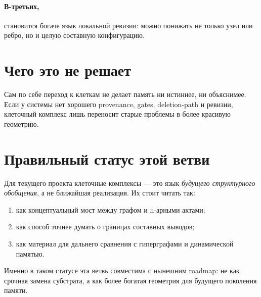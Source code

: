 \paragraph{В-третьих,} становится богаче язык локальной ревизии: можно понижать не
только узел или ребро, но и целую составную конфигурацию.

\section{Чего это не решает}

\begin{pitfall}
Сам по себе переход к клеткам не делает память ни истиннее, ни объяснимее. Если у
системы нет хорошего provenance, gates, deletion-path и ревизии, клеточный комплекс
лишь переносит старые проблемы в более красивую геометрию.
\end{pitfall}

\section{Правильный статус этой ветви}

Для текущего проекта клеточные комплексы — это язык \emph{будущего структурного
обобщения}, а не ближайшая реализация. Их стоит читать так:
\begin{enumerate}
\item как концептуальный мост между графом и n-арными актами;
\item как способ точнее думать о границах составных выводов;
\item как материал для дальнего сравнения с гиперграфами и динамической памятью.
\end{enumerate}

Именно в таком статусе эта ветвь совместима с нынешним roadmap: не как срочная
замена субстрата, а как более богатая геометрия для будущего поколения памяти.
